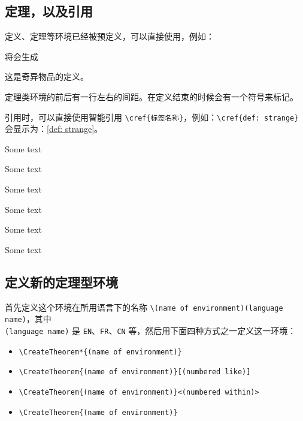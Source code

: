 \documentclass{lebhart}
\begin{document}
\subsection{定理，以及引用}

定义、定理等环境已经被预定义，可以直接使用，例如：


定理类环境的前后有一行左右的间距。在定义结束的时候会有一个符号来标记。

引用时，可以直接使用智能引用 \lstinline|\cref{标签名称}|，例如：\lstinline|\cref{def: strange}| 会显示为：\cref{def: strange}。

\begin{remark}
    Some text
\end{remark}

\begin{proposition}
    Some text
\end{proposition}

\begin{conjecture}
    Some text 
\end{conjecture}

\begin{fact}
    Some text 
\end{fact}

\begin{example*}
    Some text
\end{example*}

\begin{problem}
    Some text
\end{problem}

\subsection{定义新的定理型环境}

首先定义这个环境在所用语言下的名称 \lstinline|\(name of environment)(language name)|，其中 \\\lstinline|(language name)| 是 \lstinline|EN|、\lstinline|FR|、\lstinline|CN| 等，然后用下面四种方式之一定义这一环境：
\begin{itemize}
    \item \lstinline|\CreateTheorem*{(name of environment)}|
    \item \lstinline|\CreateTheorem{(name of environment)}[(numbered like)]|
    \item \lstinline|\CreateTheorem{(name of environment)}<(numbered within)>|
    \item \lstinline|\CreateTheorem{(name of environment)}|
\end{itemize}
\end{document}
